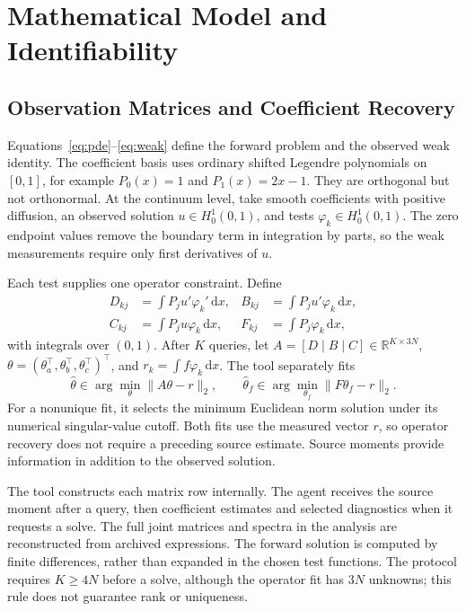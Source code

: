 \documentclass{article}
\newcommand{\dd}{\,\mathrm{d}}
\newcommand{\R}{\mathbb{R}}
\begin{document}


\clearpage
\appendix
\onecolumn
\section{Mathematical Model and Identifiability}
\label{app:math}
\subsection{Observation Matrices and Coefficient Recovery}

Equations~\eqref{eq:pde}--\eqref{eq:weak} define the forward problem and the
observed weak identity. The coefficient basis uses ordinary shifted Legendre
polynomials on \([0,1]\), for example \(P_0(x)=1\) and \(P_1(x)=2x-1\).
They are orthogonal but not orthonormal. At the continuum level, take smooth
coefficients with positive diffusion, an observed solution \(u\in H_0^1(0,1)\),
and tests \(\varphi_k\in H_0^1(0,1)\). The zero endpoint values remove the
boundary term in integration by parts, so the weak measurements require only
first derivatives of \(u\).

Each test supplies one operator constraint. Define
\begin{align}
 D_{kj}&=\int P_j u'\varphi_k'\dd x,& B_{kj}&=\int P_j u'\varphi_k\dd x,\nonumber\\
 C_{kj}&=\int P_j u\varphi_k\dd x,& F_{kj}&=\int P_j\varphi_k\dd x,
 \label{eq:matrices}
\end{align}
with integrals over \((0,1)\). After \(K\) queries, let
\(A=[D\mid B\mid C]\in\R^{K\times3N}\),
\(\theta=(\theta_a^\top,\theta_b^\top,\theta_c^\top)^\top\), and
\(r_k=\int f\varphi_k\dd x\). The tool separately fits
\begin{equation}
 \widehat\theta\in\arg\min_\theta\|A\theta-r\|_2,\qquad
 \widehat\theta_f\in\arg\min_{\theta_f}\|F\theta_f-r\|_2.
 \label{eq:fits}
\end{equation}
For a nonunique fit, it selects the minimum Euclidean norm solution under its
numerical singular-value cutoff. Both fits use the measured vector \(r\), so
operator recovery does not require a preceding source estimate. Source moments
provide information in addition to the observed solution.

The tool constructs each matrix row internally. The agent receives the source
moment after a query, then coefficient estimates and selected diagnostics when
it requests a solve. The full joint matrices and spectra in the analysis are
reconstructed from archived expressions. The forward solution is computed by
finite differences, rather than expanded in the chosen test functions. The
protocol requires \(K\ge4N\) before a solve, although the operator fit has
\(3N\) unknowns; this rule does not guarantee rank or uniqueness.
\end{document}
